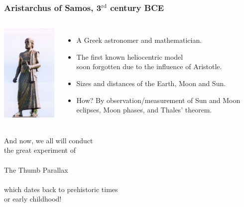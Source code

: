 \documentclass[aspectratio=169,xcolor=pdftex,dvipsnames]{beamer} %
\begin{document}
\begin{frame}
\frametitle{Aristarchus of Samos, 3$^{\text{rd}}$ century BCE}


\begin{columns}

      \includegraphics[width=45mm]{aristarchus.jpeg}
\vspace{-10mm}

\begin{itemize}
\item
A Greek astronomer and mathematician.

\item
The first known heliocentric model\\
soon forgotten due to the influence of Aristotle.
\item
Sizes and distances of the Earth, Moon and Sun.
\item
How? By observation/measurement of Sun and Moon eclipses, Moon phases, and Thales' theorem.
\end{itemize}

\end{columns} 

\end{frame}

\begin{frame}

\centering
\pause
\LARGE{
And now, \pause 
we all will conduct\pause
\\
the great experiment of\pause
\\ \ \\
{\Huge{The Thumb Parallax}}\pause
\\ \ \\
which dates back to prehistoric times\pause
\\
or early childhood!
}

\end{frame}
\end{document}

